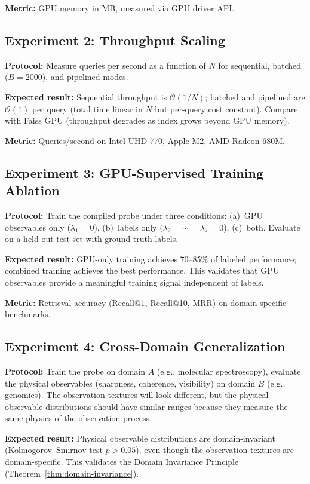 \documentclass[11pt,twocolumn,a4paper]{article}
\newcommand{\BigO}{\mathcal{O}}
\begin{document}
\textbf{Metric:} GPU memory in MB, measured via GPU driver API.

\subsection{Experiment 2: Throughput Scaling}

\textbf{Protocol:} Measure queries per second as a function of $N$
for sequential, batched ($B = 2000$), and pipelined modes.

\textbf{Expected result:} Sequential throughput is $\BigO(1/N)$;
batched and pipelined are $\BigO(1)$ per query (total time linear
in $N$ but per-query cost constant). Compare with Faiss GPU
(throughput degrades as index grows beyond GPU memory).

\textbf{Metric:} Queries/second on Intel UHD 770, Apple M2,
AMD Radeon 680M.

\subsection{Experiment 3: GPU-Supervised Training Ablation}

\textbf{Protocol:} Train the compiled probe under three conditions:
(a)~GPU observables only ($\lambda_1 = 0$), (b)~labels only
($\lambda_2 = \cdots = \lambda_7 = 0$), (c)~both. Evaluate on
a held-out test set with ground-truth labels.

\textbf{Expected result:} GPU-only training achieves 70--85\% of
labeled performance; combined training achieves the best performance.
This validates that GPU observables provide a meaningful training
signal independent of labels.

\textbf{Metric:} Retrieval accuracy (Recall@1, Recall@10, MRR) on
domain-specific benchmarks.

\subsection{Experiment 4: Cross-Domain Generalization}

\textbf{Protocol:} Train the probe on domain $A$ (e.g., molecular
spectroscopy), evaluate the physical observables (sharpness,
coherence, visibility) on domain $B$ (e.g., genomics). The
observation textures will look different, but the physical
observable distributions should have similar ranges because they
measure the same physics of the observation process.

\textbf{Expected result:} Physical observable distributions are
domain-invariant (Kolmogorov--Smirnov test $p > 0.05$), even though
the observation textures are domain-specific. This validates the
Domain Invariance Principle (Theorem~\ref{thm:domain-invariance}).
\end{document}
